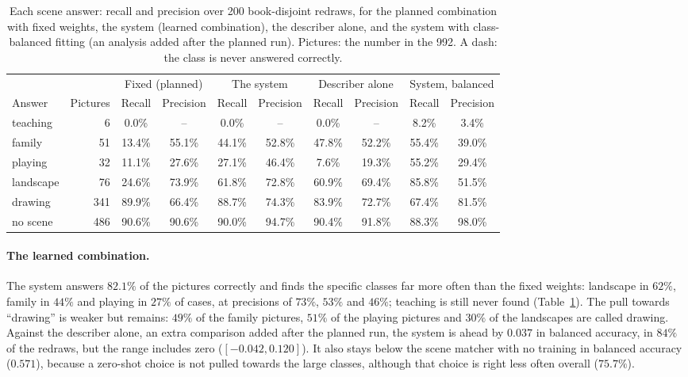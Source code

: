 \begin{table}[!htbp]
\centering
\caption[Recall and precision per scene answer]{Each scene answer: recall and precision over 200 book-disjoint redraws, for the planned combination with fixed weights, the system (learned combination), the describer alone, and the system with class-balanced fitting (an analysis added after the planned run). Pictures: the number in the 992. A dash: the class is never answered correctly.}
\label{tab:scene_classes_per_class}
\small
\begin{adjustbox}{max width=\textwidth}
\begin{tabular}{lrcccccccc}
\toprule
 & & \multicolumn{2}{c}{Fixed (planned)} & \multicolumn{2}{c}{The system} & \multicolumn{2}{c}{Describer alone} & \multicolumn{2}{c}{System, balanced} \\
\cmidrule(lr){3-4}\cmidrule(lr){5-6}\cmidrule(lr){7-8}\cmidrule(lr){9-10}
Answer & Pictures & Recall & Precision & Recall & Precision & Recall & Precision & Recall & Precision \\
\midrule
teaching & 6 & 0.0\% & -- & 0.0\% & -- & 0.0\% & -- & 8.2\% & 3.4\% \\
family & 51 & 13.4\% & 55.1\% & 44.1\% & 52.8\% & 47.8\% & 52.2\% & 55.4\% & 39.0\% \\
playing & 32 & 11.1\% & 27.6\% & 27.1\% & 46.4\% & 7.6\% & 19.3\% & 55.2\% & 29.4\% \\
landscape & 76 & 24.6\% & 73.9\% & 61.8\% & 72.8\% & 60.9\% & 69.4\% & 85.8\% & 51.5\% \\
drawing & 341 & 89.9\% & 66.4\% & 88.7\% & 74.3\% & 83.9\% & 72.7\% & 67.4\% & 81.5\% \\
no scene & 486 & 90.6\% & 90.6\% & 90.0\% & 94.7\% & 90.4\% & 91.8\% & 88.3\% & 98.0\% \\
\bottomrule
\end{tabular}
\end{adjustbox}
\end{table}

\paragraph{The learned combination.} The system answers $82.1\%$ of the pictures correctly and finds the specific classes far more often than the fixed weights: landscape in $62\%$, family in $44\%$ and playing in $27\%$ of cases, at precisions of $73\%$, $53\%$ and $46\%$; teaching is still never found (Table~\ref{tab:scene_classes_per_class}). The pull towards ``drawing'' is weaker but remains: $49\%$ of the family pictures, $51\%$ of the playing pictures and $30\%$ of the landscapes are called drawing. Against the describer alone, an extra comparison added after the planned run, the system is ahead by $0.037$ in balanced accuracy, in $84\%$ of the redraws, but the range includes zero ($[-0.042, 0.120]$). It also stays below the scene matcher with no training in balanced accuracy ($0.571$), because a zero-shot choice is not pulled towards the large classes, although that choice is right less often overall ($75.7\%$).

